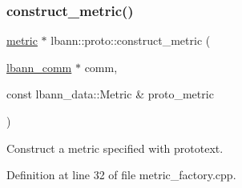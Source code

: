 \subsubsection{\texorpdfstring{construct\+\_\+metric()}{construct\_metric()}}
{\footnotesize\ttfamily \hyperlink{classlbann_1_1metric}{metric} $\ast$ lbann\+::proto\+::construct\+\_\+metric (\begin{DoxyParamCaption}\item[{\hyperlink{classlbann_1_1lbann__comm}{lbann\+\_\+comm} $\ast$}]{comm,  }\item[{const lbann\+\_\+data\+::\+Metric \&}]{proto\+\_\+metric }\end{DoxyParamCaption})}

Construct a metric specified with prototext. 

Definition at line 32 of file metric\+\_\+factory.\+cpp.


